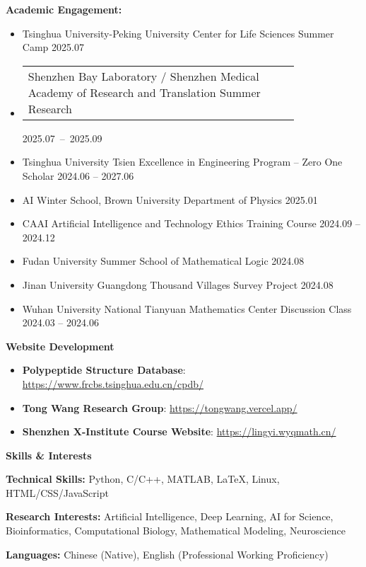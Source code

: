 \documentclass[11pt]{article}
\begin{document}
	\textbf{Academic Engagement:}
	\begin{itemize}[noitemsep, topsep=0pt, partopsep=0pt, parsep=0pt, leftmargin=*]
		\item Tsinghua University-Peking University Center for Life Sciences Summer Camp \hfill 2025.07
		\item \begin{tabular}[c]{@{}p{0.8\linewidth}@{}}Shenzhen Bay Laboratory / Shenzhen Medical Academy of Research and Translation Summer Research\end{tabular} \hfill \mbox{2025.07 -- 2025.09}
		\item Tsinghua University Tsien Excellence in Engineering Program -- Zero One Scholar \hfill 2024.06 -- 2027.06
		\item AI Winter School, Brown University Department of Physics \hfill 2025.01
		\item CAAI Artificial Intelligence and Technology Ethics Training Course \hfill 2024.09 -- 2024.12
		\item Fudan University Summer School of Mathematical Logic \hfill 2024.08
		\item Jinan University Guangdong Thousand Villages Survey Project \hfill 2024.08
		\item Wuhan University National Tianyuan Mathematics Center Discussion Class \hfill 2024.03 -- 2024.06
	\end{itemize}
	
	\vspace{12pt}

	\begin{center}
		\textbf{\large Website Development}
	\end{center}
	\begin{itemize}[noitemsep, topsep=0pt, partopsep=0pt, parsep=0pt, leftmargin=*]
		\item \textbf{Polypeptide Structure Database}: \href{https://www.frcbs.tsinghua.edu.cn/cpdb/}{https://www.frcbs.tsinghua.edu.cn/cpdb/}
		\item \textbf{Tong Wang Research Group}: \href{https://tongwang.vercel.app/}{https://tongwang.vercel.app/}
		\item \textbf{Shenzhen X-Institute Course Website}: \href{https://lingyi.wyqmath.cn/}{https://lingyi.wyqmath.cn/}
	\end{itemize}

	\vspace{12pt}

	\begin{center}
		\textbf{\large Skills \& Interests}
	\end{center}
	\textbf{Technical Skills:} Python, C/C++, MATLAB, LaTeX, Linux, HTML/CSS/JavaScript
	
	\textbf{Research Interests:} Artificial Intelligence, Deep Learning, AI for Science, Bioinformatics, Computational Biology, Mathematical Modeling, Neuroscience
	
	\textbf{Languages:} Chinese (Native), English (Professional Working Proficiency)
	
\end{document}
